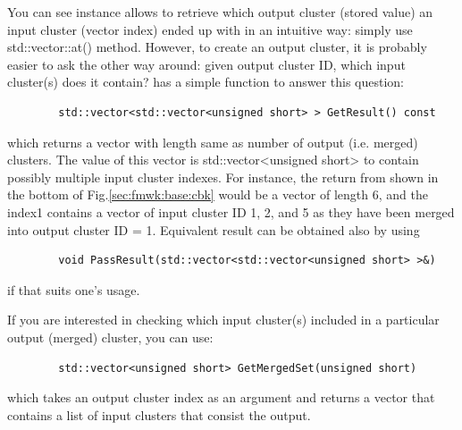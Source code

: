 You can see {\cbkeeper} instance allows to retrieve which output cluster (stored value) an input cluster (vector index) ended up with in an intuitive way: simply use {\ttfamily std::vector::at()} method.
However, to create an output cluster, it is probably easier to ask the other way around: given output cluster ID, which input cluster(s) does it contain?
{\cbkeeper} has a simple function to answer this question:
\begin{lstlisting}
        std::vector<std::vector<unsigned short> > GetResult() const 
\end{lstlisting}
which returns a vector with length same as number of output (i.e. merged) clusters.
The value of this vector is {\ttfamily std::vector<unsigned short>} to contain possibly multiple input cluster indexes.
For instance, the return from {\cbkeeper} shown in the bottom of Fig.\ref{sec:fmwk:base:cbk} would be a vector of length 6, and the index1 contains a vector of input cluster ID 1, 2, and 5 as they have been merged into output cluster ID = 1.
Equivalent result can be obtained also by using
\begin{lstlisting}
        void PassResult(std::vector<std::vector<unsigned short> >&)
\end{lstlisting}
if that suits one's usage. 

If you are interested in checking which input cluster(s) included in a particular output (merged) cluster, you can use:
\begin{lstlisting}
        std::vector<unsigned short> GetMergedSet(unsigned short)
\end{lstlisting}
which takes an output cluster index as an argument and returns a vector that contains a list of input clusters that consist the output.


